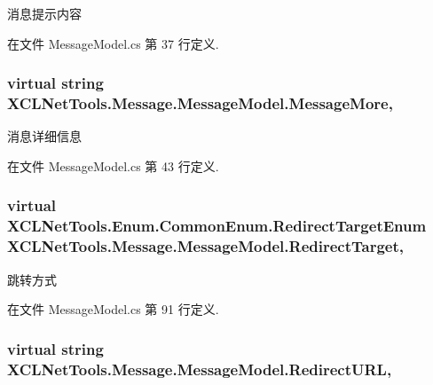 消息提示内容 



在文件 Message\-Model.\-cs 第 37 行定义.

\hypertarget{class_x_c_l_net_tools_1_1_message_1_1_message_model_ae30c575345756a20443bb2f26ecdf1e9}{
\subsubsection[{Message\-More}]{\setlength{\rightskip}{0pt plus 5cm}virtual string X\-C\-L\-Net\-Tools.\-Message.\-Message\-Model.\-Message\-More\hspace{0.3cm}{\ttfamily [get]}, {\ttfamily [set]}}}\label{class_x_c_l_net_tools_1_1_message_1_1_message_model_ae30c575345756a20443bb2f26ecdf1e9}


消息详细信息 



在文件 Message\-Model.\-cs 第 43 行定义.

\hypertarget{class_x_c_l_net_tools_1_1_message_1_1_message_model_a318553f7c9db2b2c685e4944feb2901e}{
\subsubsection[{Redirect\-Target}]{\setlength{\rightskip}{0pt plus 5cm}virtual {\bf X\-C\-L\-Net\-Tools.\-Enum.\-Common\-Enum.\-Redirect\-Target\-Enum} X\-C\-L\-Net\-Tools.\-Message.\-Message\-Model.\-Redirect\-Target\hspace{0.3cm}{\ttfamily [get]}, {\ttfamily [set]}}}\label{class_x_c_l_net_tools_1_1_message_1_1_message_model_a318553f7c9db2b2c685e4944feb2901e}


跳转方式 



在文件 Message\-Model.\-cs 第 91 行定义.

\hypertarget{class_x_c_l_net_tools_1_1_message_1_1_message_model_a571c6e0204605733f900eb3f906e038d}{
\subsubsection[{Redirect\-U\-R\-L}]{\setlength{\rightskip}{0pt plus 5cm}virtual string X\-C\-L\-Net\-Tools.\-Message.\-Message\-Model.\-Redirect\-U\-R\-L\hspace{0.3cm}{\ttfamily [get]}, {\ttfamily [set]}}}\label{class_x_c_l_net_tools_1_1_message_1_1_message_model_a571c6e0204605733f900eb3f906e038d}


